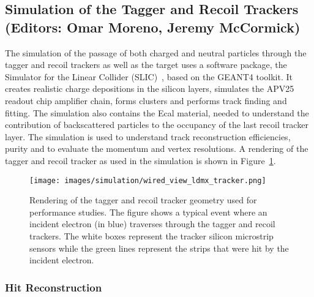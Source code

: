 
\subsection{Simulation of the Tagger and Recoil Trackers (Editors: Omar Moreno, Jeremy McCormick)}

The simulation of the passage of both charged and neutral particles through 
the tagger and recoil trackers as well as the target uses a software 
package, the Simulator for the Linear Collider (SLIC)~\cite{}, based on the
GEANT4 toolkit. It creates realistic charge depositions in the silicon layers,
simulates the APV25 readout chip amplifier chain, forms clusters and performs
track finding and fitting.  The simulation also contains the Ecal material,
needed to understand the contribution of backscattered particles to the 
occupancy of the last recoil tracker layer.
The simulation is used to understand track reconstruction efficiencies,
purity and to evaluate the momentum and vertex resolutions. A rendering of
the tagger and recoil tracker as used in the simulation is shown in
Figure~\ref{fig:ldmx_tracker_geo}.
\begin{figure}
    \centering
    \texttt{[image: images/simulation/wired\_view\_ldmx\_tracker.png]}
    \caption{Rendering of the tagger and recoil tracker geometry used for 
        performance studies.  The figure shows a typical event where an 
        incident electron (in blue) traverses through the tagger and recoil 
        trackers. The white boxes represent the tracker silicon microstrip
        sensors while the green lines represent the strips that were hit by
        the incident electron.}
    \label{fig:ldmx_tracker_geo}
\end{figure}

\subsubsection{Hit Reconstruction}

